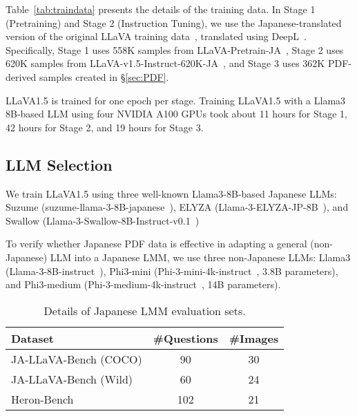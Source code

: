 Table~\ref{tab:traindata} presents the details of the training data.
In Stage 1 (Pretraining) and Stage 2 (Instruction Tuning), we use the Japanese-translated version of the original LLaVA training data~\cite{inoue2024heron}, translated using DeepL~\cite{DeepL}.
Specifically, Stage 1 uses 558K samples from LLaVA-Pretrain-JA~\cite{llava_pretrain_ja}, Stage 2 uses 620K samples from LLaVA-v1.5-Instruct-620K-JA~\cite{llava_instruct_620k_ja}, and Stage 3 uses 362K PDF-derived samples created in \S\ref{sec:PDF}.


LLaVA1.5 is trained for one epoch per stage.
Training LLaVA1.5 with a Llama3 8B-based LLM using four NVIDIA A100 GPUs took about 11 hours for Stage 1, 42 hours for Stage 2, and 19 hours for Stage 3.


\subsection{LLM Selection}\label{subsec:llm}
We train LLaVA1.5 using three well-known Llama3-8B-based Japanese LLMs:
Suzume (suzume-llama-3-8B-japanese~\cite{suzume-paper}), ELYZA (Llama-3-ELYZA-JP-8B~\cite{elyzallama2024}), and Swallow (Llama-3-Swallow-8B-Instruct-v0.1~\cite{swallow-paper})

To verify whether Japanese PDF data is effective in adapting a general (non-Japanese) LLM into a Japanese LMM, we use three non-Japanese LLMs:
Llama3 (Llama-3-8B-instruct~\cite{llama3.1}), Phi3-mini (Phi-3-mini-4k-instruct~\cite{abdin2024phi}, 3.8B parameters), and Phi3-medium (Phi-3-medium-4k-instruct~\cite{abdin2024phi}, 14B parameters).


\begin{table}[t] 
  \tabcolsep=0.15cm
    \begin{center}
    \vspace{-1mm}
        \begin{adjustbox}{width=0.83\linewidth}
        \begin{tabular}{@{}l|cc@{}}
            \toprule
            \textbf{Dataset} & \textbf{\#Questions} & \textbf{\#Images}  \\
            \midrule
            JA-LLaVA-Bench (COCO) & 90 & 30 \\
            JA-LLaVA-Bench (Wild) & 60 & 24 \\ 
            Heron-Bench & 102 & 21 \\
            \bottomrule
        \end{tabular}
        \end{adjustbox}
    \vspace{-2mm}
    \caption{Details of Japanese LMM evaluation sets.}
    \label{tab:evaldata}
    \end{center}
\end{table} 


